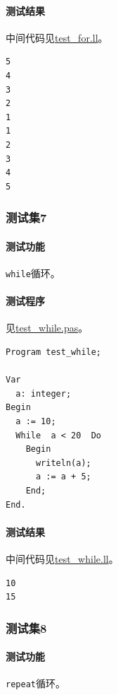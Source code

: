 \documentclass[lang=cn,11pt,a4paper,cite=authornum]{paper}
\begin{document}
\paragraph{测试结果} 中间代码见\href{run:../test/test_for.ll}{test\_for.ll}。

\begin{code}
\begin{verbatim}
5
4
3
2
1
1
2
3
4
5
\end{verbatim}
\end{code}

\subsubsection{测试集7}

\paragraph{测试功能} \texttt{while}循环。

\paragraph{测试程序} 见\href{run:../test/test_while.pas}{test\_while.pas}。

\begin{code}
\begin{verbatim}
Program test_while;

Var 
  a: integer;
Begin
  a := 10;
  While  a < 20  Do
    Begin
      writeln(a);
      a := a + 5;
    End;
End.
\end{verbatim}
\end{code}

\paragraph{测试结果} 中间代码见\href{run:../test/test_while.ll}{test\_while.ll}。

\begin{code}
\begin{verbatim}
10
15
\end{verbatim}
\end{code}

\subsubsection{测试集8}

\paragraph{测试功能} \texttt{repeat}循环。
\end{document}
